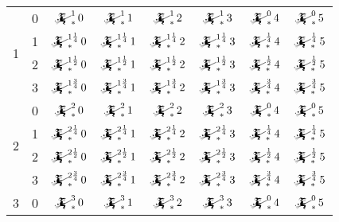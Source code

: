 \documentclass{article}
\newcommand{\mainfun}[3]{\mathwitch_{#1}^{#2}#3}
\begin{document}
\begin{table}[H]
\begin{tabular}{c|c|c|c|c|c|c|c|}
			\multirow{4}{*}{1}     &  0                        &    $\mainfun{*}10$           &    $\mainfun{*}11$           &    $\mainfun{*}12$           &    $\mainfun{*}13$           &    $\mainfun{*}04$          &    $\mainfun{*}05$          \\\cline{2-8}
			                       &  1                        &    $\mainfun{*}{1\frac14}0$  &    $\mainfun{*}{1\frac14}1$  &    $\mainfun{*}{1\frac14}2$  &    $\mainfun{*}{1\frac14}3$  &    $\mainfun{*}{\frac14}4$  &    $\mainfun{*}{\frac14}5$  \\\cline{2-8}
			                       &  2                        &    $\mainfun{*}{1\frac12}0$  &    $\mainfun{*}{1\frac12}1$  &    $\mainfun{*}{1\frac12}2$  &    $\mainfun{*}{1\frac12}3$  &    $\mainfun{*}{\frac12}4$  &    $\mainfun{*}{\frac12}5$  \\\cline{2-8}
			                       &  3                        &    $\mainfun{*}{1\frac34}0$  &    $\mainfun{*}{1\frac34}1$  &    $\mainfun{*}{1\frac34}2$  &    $\mainfun{*}{1\frac34}3$  &    $\mainfun{*}{\frac34}4$  &    $\mainfun{*}{\frac34}5$  \\\hline\hline
			\multirow{4}{*}{2}     &  0                        &    $\mainfun{*}20$           &    $\mainfun{*}21$           &    $\mainfun{*}22$           &    $\mainfun{*}23$           &    $\mainfun{*}04$          &    $\mainfun{*}05$          \\\cline{2-8}
			                       &  1                        &    $\mainfun{*}{2\frac14}0$  &    $\mainfun{*}{2\frac14}1$  &    $\mainfun{*}{2\frac14}2$  &    $\mainfun{*}{2\frac14}3$  &    $\mainfun{*}{\frac14}4$  &    $\mainfun{*}{\frac14}5$  \\\cline{2-8}
			                       &  2                        &    $\mainfun{*}{2\frac12}0$  &    $\mainfun{*}{2\frac12}1$  &    $\mainfun{*}{2\frac12}2$  &    $\mainfun{*}{2\frac12}3$  &    $\mainfun{*}{\frac12}4$  &    $\mainfun{*}{\frac12}5$  \\\cline{2-8}
			                       &  3                        &    $\mainfun{*}{2\frac34}0$  &    $\mainfun{*}{2\frac34}1$  &    $\mainfun{*}{2\frac34}2$  &    $\mainfun{*}{2\frac34}3$  &    $\mainfun{*}{\frac34}4$  &    $\mainfun{*}{\frac34}5$  \\\hline\hline
			\multirow{4}{*}{3}     &  0                        &    $\mainfun{*}30$           &    $\mainfun{*}31$           &    $\mainfun{*}32$           &    $\mainfun{*}33$           &    $\mainfun{*}04$          &    $\mainfun{*}05$          \\\cline{2-8}

\end{tabular}
\end{table}
\end{document}
